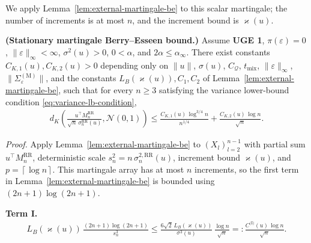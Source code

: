 We apply Lemma~\ref{lem:external-martingale-be} to this scalar martingale; the number of
increments is at most \(n\), and the increment bound is \(\varkappa(u)\).

\begin{theorem}\label{thm:M-RR-BE}
  \textbf{(Stationary martingale Berry--Esseen bound.)}
  Assume \textbf{UGE 1}, \(\pi(\varepsilon) = 0\), \(\lVert  \varepsilon  \rVert_\infty < \infty\),
  \(\sigma^2(u) > 0\), \(0 < \alpha\), and \(2 \alpha \le \alpha_\infty\). There exist
  constants \(C_{K, 1}(u), C_{K, 2}(u) > 0\) depending only on \(\lVert  u  \rVert\),
  \(\sigma(u)\), \(C_{\mathcal{Q}}\), \(t_{\text{mix}}\), \(\lVert  \varepsilon  \rVert_\infty\),
  \(\lVert  \Sigma_{\varepsilon}^{(\text{M})}  \rVert\), and the constants
  \(L_B(\varkappa(u)), C_1, C_2\) of Lemma~\ref{lem:external-martingale-be}, such that for every
  \(n \ge 3\) satisfying
  the variance lower-bound condition \eqref{eq:variance-lb-condition},
\begin{equation}
\begin{aligned}
  d_K \left(
    \frac{u^\top M_n^{\text{RR}}}{\sqrt{n} \, \sigma_n^{\text{RR}}(u)},
    \mathcal{N}(0, 1)
  \right)
    \le \frac{C_{K, 1}(u) \, \log^{3 / 4} n}{n^{1 / 4}}
     + \frac{C_{K, 2}(u) \, \log n}{\sqrt{n}}.
\end{aligned}
\label{eq:M-RR-BE}
\end{equation}
\end{theorem}

\textit{Proof.} Apply Lemma~\ref{lem:external-martingale-be} to
\((X_l)_{l = 2}^{n - 1}\) with partial sum \(u^\top M_n^{\text{RR}}\),
deterministic scale \(s_n^2 = n \, \sigma_n^{2, \text{RR}}(u)\), increment bound
\(\varkappa(u)\), and \(p = \left\lceil \log n \right\rceil\). This martingale array has at most \(n\)
increments, so the first term in Lemma~\ref{lem:external-martingale-be} is bounded using
\((2 n + 1) \log(2 n + 1)\).

\textbf{Term I.}
\begin{equation}
\begin{aligned}
L_B(\varkappa(u)) \, \frac{(2 n + 1) \log(2 n + 1)}{s_n^3}
  \le \frac{6 \sqrt{2} \, L_B(\varkappa(u))}{\sigma^3(u)} \, \frac{\log n}{\sqrt{n}}
  =: \frac{C^{\text{(I)}}(u) \, \log n}{\sqrt{n}}.
\end{aligned}
\label{eq:term-I}
\end{equation}

